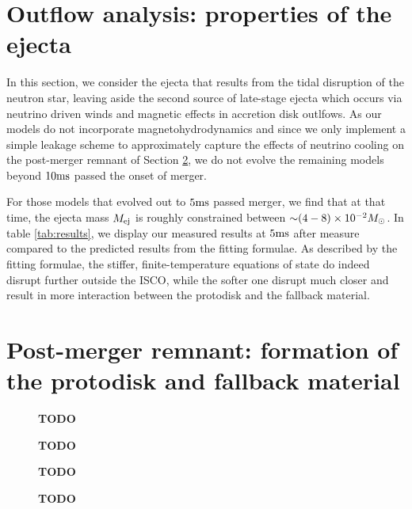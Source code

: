 \section{Outflow analysis: properties of the ejecta}
\label{tailanalysis}

In this section, we consider the ejecta that results from the tidal disruption of the neutron star, leaving aside the second source of late-stage ejecta which occurs via neutrino driven winds and magnetic effects in accretion disk outlfows.  As our models do not incorporate magnetohydrodynamics and since we only implement a simple leakage scheme to approximately capture the effects of neutrino cooling on the post-merger remnant of Section \ref{sec:diskanalysis}, we do not evolve the remaining models beyond $10 {\rm ms}$ passed the onset of merger.

For those models that evolved out to $5 {\rm ms}$ passed merger, we find that at that time, the ejecta mass $M_{\rm ej}$ is roughly constrained between $\mathord{\sim} (4 - 8) \times 10^{-2} M_\odot$.  In table \ref{tab:results}, we display our measured results at $5 {\rm ms}$ after measure compared to the predicted results from the fitting formulae.  As described by the fitting formulae, the stiffer, finite-temperature equations of state do indeed disrupt further outside the ISCO, while the softer one disrupt much closer and result in more interaction between the protodisk and the fallback material.

\section{Post-merger remnant: formation of the protodisk and fallback material}
\label{sec:diskanalysis}


\begin{figure}
	\centering
	
	\caption[]{
		\textbf{TODO}
	}
	\label{fig:diskdensities}
\end{figure}

\begin{figure}
	\centering
	
	\caption[]{
		\textbf{TODO}
	}
	\label{fig:disktemps}
\end{figure}

\begin{figure}
	\centering
	
	\caption[]{
		\textbf{TODO}
	}
	\label{fig:diskYes}
\end{figure}

\begin{figure}
	\centering
	
	\caption[]{
		\textbf{TODO}
	}
	\label{fig:diskentropies}
\end{figure}


